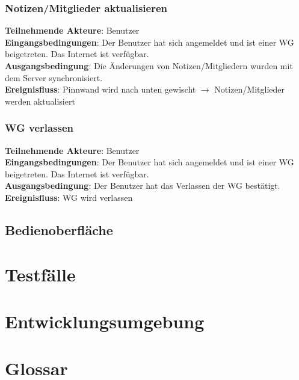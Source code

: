 \documentclass[a4paper]{scrreprt}
\begin{document}
        	\subsection{Notizen/Mitglieder aktualisieren}
        	\textbf{Teilnehmende Akteure}: Benutzer \\
        	\textbf{Eingangsbedingungen}: Der Benutzer hat sich angemeldet und ist einer WG beigetreten. Das Internet ist verfügbar. \\
        	\textbf{Ausgangsbedingung}: Die Änderungen von Notizen/Mitgliedern wurden mit dem Server synchronisiert. \\
        	\textbf{Ereignisfluss}: Pinnwand wird nach unten gewischt $\rightarrow$ Notizen/Mitglieder werden aktualisiert
        	
        	\subsection{WG verlassen}
        	\textbf{Teilnehmende Akteure}: Benutzer \\
        	\textbf{Eingangsbedingungen}: Der Benutzer hat sich angemeldet und ist einer WG beigetreten. Das Internet ist verfügbar. \\
        	\textbf{Ausgangsbedingung}: Der Benutzer hat das Verlassen der WG bestätigt. \\
        	\textbf{Ereignisfluss}: WG wird verlassen
        	
        	\newpage
        \section{Bedienoberfläche}

    \chapter{Testfälle}
    
    \chapter{Entwicklungsumgebung}

	\chapter{Glossar}
	
    \glsaddall
    \printglossaries

    \listoffigures
\end{document}
